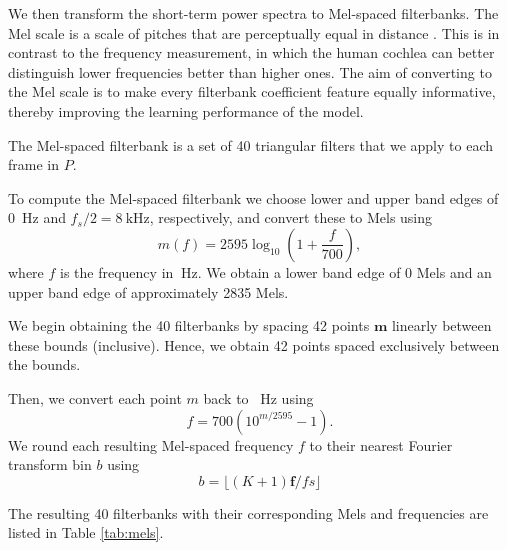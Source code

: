 			We then transform the short-term power spectra to Mel-spaced filterbanks.
			The Mel scale is a scale of pitches that are perceptually equal in distance \citep{stevens1937scale}.
			This is in contrast to the frequency measurement, in which the human cochlea can better distinguish lower frequencies better than higher ones.
			The aim of converting to the Mel scale is to make every filterbank coefficient feature equally informative, thereby improving the learning performance of the model.

			The Mel-spaced filterbank is a set of 40 triangular filters that we apply to each frame in $P$.

			To compute the Mel-spaced filterbank we choose lower and upper band edges of \SI{0}{\Hz} and $f_s/2 = \SI{8}{\kHz}$, respectively, and convert these to Mels using
			\begin{equation}
				m(f) = 2595\log_{10}\left(1 + \frac{f}{700}\right),
			\end{equation}
			where $f$ is the frequency in $\SI{}{\Hz}$.
			We obtain a lower band edge of 0 Mels and an upper band edge of approximately 2835 Mels.

			We begin obtaining the 40 filterbanks by spacing 42 points $\mathbf{m}$ linearly between these bounds (inclusive).
			Hence, we obtain 42 points spaced exclusively between the bounds.

			Then, we convert each point $m$ back to \SI{}{\Hz} using
			\begin{equation}
				f = 700\left(10^{m/2595}-1\right).
			\end{equation}
			We round each resulting Mel-spaced frequency $f$ to their nearest Fourier transform bin $b$ using
			\begin{equation}
				b = \lfloor(K+1)\mathbf{f}/fs\rfloor
			\end{equation}

			The resulting 40 filterbanks with their corresponding Mels and frequencies are listed in Table \ref{tab:mels}.

